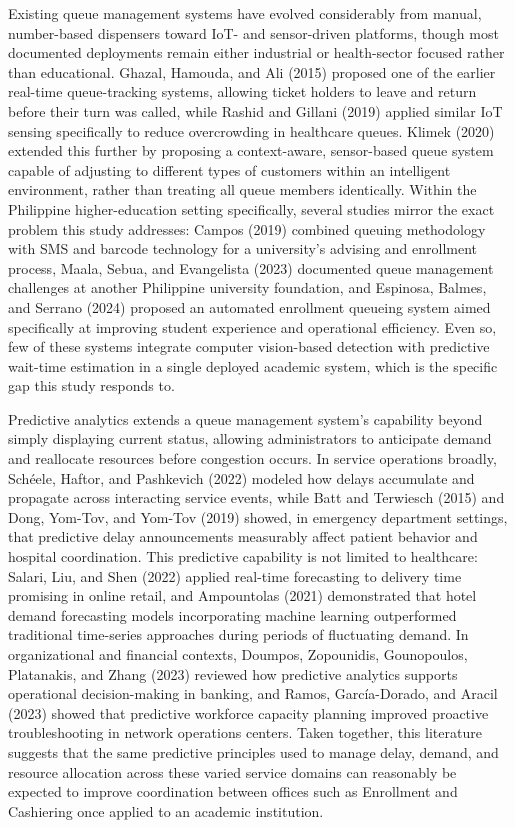 \documentclass{research}
\begin{document}
Existing queue management systems have evolved considerably from manual, number-based dispensers toward IoT- and sensor-driven platforms, though most documented deployments remain either industrial or health-sector focused rather than educational. Ghazal, Hamouda, and Ali (2015) proposed one of the earlier real-time queue-tracking systems, allowing ticket holders to leave and return before their turn was called, while Rashid and Gillani (2019) applied similar IoT sensing specifically to reduce overcrowding in healthcare queues. Klimek (2020) extended this further by proposing a context-aware, sensor-based queue system capable of adjusting to different types of customers within an intelligent environment, rather than treating all queue members identically. Within the Philippine higher-education setting specifically, several studies mirror the exact problem this study addresses: Campos (2019) combined queuing methodology with SMS and barcode technology for a university's advising and enrollment process, Maala, Sebua, and Evangelista (2023) documented queue management challenges at another Philippine university foundation, and Espinosa, Balmes, and Serrano (2024) proposed an automated enrollment queueing system aimed specifically at improving student experience and operational efficiency. Even so, few of these systems integrate computer vision-based detection with predictive wait-time estimation in a single deployed academic system, which is the specific gap this study responds to.

Predictive analytics extends a queue management system's capability beyond simply displaying current status, allowing administrators to anticipate demand and reallocate resources before congestion occurs. In service operations broadly, Schéele, Haftor, and Pashkevich (2022) modeled how delays accumulate and propagate across interacting service events, while Batt and Terwiesch (2015) and Dong, Yom-Tov, and Yom-Tov (2019) showed, in emergency department settings, that predictive delay announcements measurably affect patient behavior and hospital coordination. This predictive capability is not limited to healthcare: Salari, Liu, and Shen (2022) applied real-time forecasting to delivery time promising in online retail, and Ampountolas (2021) demonstrated that hotel demand forecasting models incorporating machine learning outperformed traditional time-series approaches during periods of fluctuating demand. In organizational and financial contexts, Doumpos, Zopounidis, Gounopoulos, Platanakis, and Zhang (2023) reviewed how predictive analytics supports operational decision-making in banking, and Ramos, García-Dorado, and Aracil (2023) showed that predictive workforce capacity planning improved proactive troubleshooting in network operations centers. Taken together, this literature suggests that the same predictive principles used to manage delay, demand, and resource allocation across these varied service domains can reasonably be expected to improve coordination between offices such as Enrollment and Cashiering once applied to an academic institution.
\end{document}
